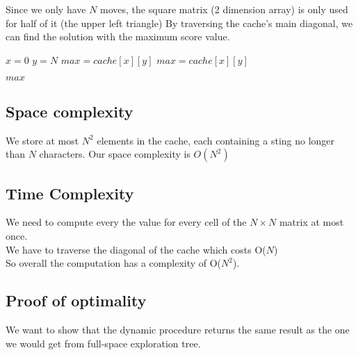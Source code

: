 \documentclass{article}
\begin{document}
Since we only have $N$ moves, the square matrix (2 dimension array) is only used for half of it (the upper left triangle)
By traversing the cache's main diagonal, we can find the solution with the maximum score value.


\begin{algorithm}[H]
\begin{algorithmic}
\caption{}
\State $x = 0$	
\State $y = N$	
\State $max = cache[x][y]$
		\State $max = cache[x][y]$	
	\EndIf
\EndFor

\Return $max$
\EndProcedure
\end{algorithmic}
\end{algorithm}


\subsection{Space complexity}
We store at most $N^2$ elements in the cache, each containing a sting no longer than $N$ characters. Our space complexity is $O(N^2)$

\subsection{Time Complexity}

We need to compute every the value for every cell of the $N\times N$ matrix at most once.
\\[0.3cm]
We have to traverse the diagonal of the cache which costs O($N$)
\\[0.3cm]
So overall the computation has a complexity of O($N^{2}$).

\subsection{Proof of optimality}

We want to show that the dynamic procedure returns the same result as the one we would get from full-space exploration tree.
\end{document}
